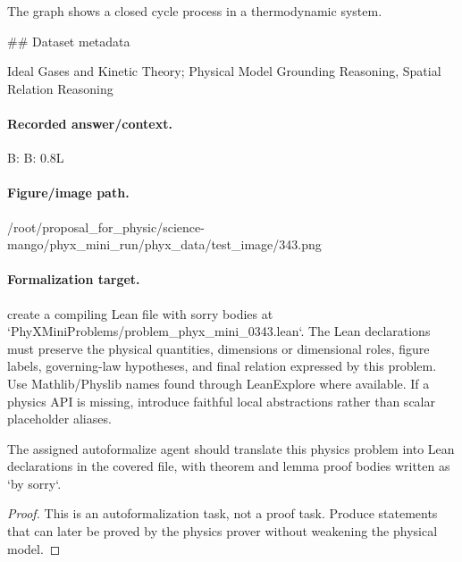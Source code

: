 The graph shows a closed cycle process in a thermodynamic system.

\#\# Dataset metadata

Ideal Gases and Kinetic Theory; Physical Model Grounding Reasoning, Spatial Relation Reasoning

\paragraph{Recorded answer/context.}
B: B: 0.8L

\paragraph{Figure/image path.}
/root/proposal\_for\_physic/science-mango/phyx\_mini\_run/phyx\_data/test\_image/343.png

\paragraph{Formalization target.}
create a compiling Lean file with sorry bodies at `PhyXMiniProblems/problem\_phyx\_mini\_0343.lean`. The Lean declarations must preserve the physical quantities, dimensions or dimensional roles, figure labels, governing-law hypotheses, and final relation expressed by this problem.
Use Mathlib/Physlib names found through LeanExplore where available. If a physics API is missing, introduce faithful local abstractions rather than scalar placeholder aliases.

\begin{theorem}
\label{thm:physics:phyx_mini_0343:target}
The assigned autoformalize agent should translate this physics problem into Lean declarations in the covered file, with theorem and lemma proof bodies written as `by sorry`.
\end{theorem}
\begin{proof}
This is an autoformalization task, not a proof task. Produce statements that can later be proved by the physics prover without weakening the physical model.
\end{proof}

